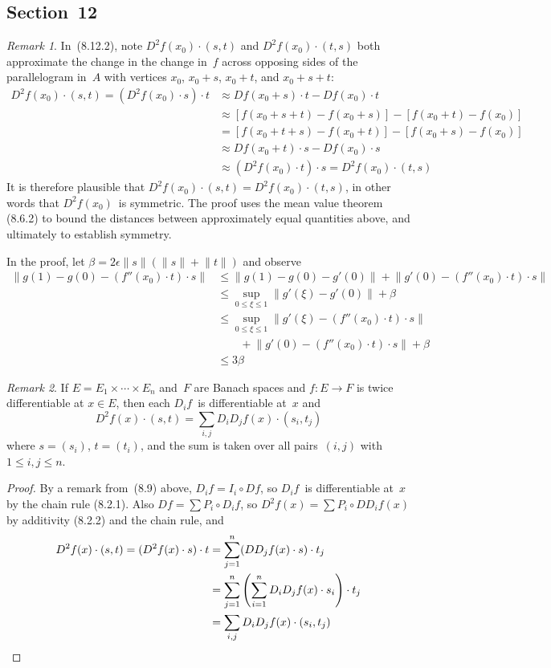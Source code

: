 \documentclass[letterpaper,12pt]{article}
\newcommand{\after}{\circ}
\newcommand{\at}{\cdot}
\newcommand{\norm}[1]{\lVert{#1}\rVert}
\theoremstyle{plain}
\theoremstyle{definition}
\theoremstyle{remark}
\newtheorem*{rmk}{Remark}
\begin{document}
\subsection*{Section~12}
\begin{rmk}
In~(8.12.2), note \(D^2f(x_0)\at(s,t)\) and \(D^2f(x_0)\at(t,s)\) both approximate the change in the change in~\(f\) across opposing sides of the parallelogram in~\(A\) with vertices \(x_0\), \(x_0+s\), \(x_0+t\), and \(x_0+s+t\):
\begin{align*}
D^2f(x_0)\at(s,t)=(D^2f(x_0)\at s)\at t&\approx Df(x_0+s)\at t-Df(x_0)\at t\\
	&\approx[f(x_0+s+t)-f(x_0+s)]-[f(x_0+t)-f(x_0)]\\
	&=[f(x_0+t+s)-f(x_0+t)]-[f(x_0+s)-f(x_0)]\\
	&\approx Df(x_0+t)\at s-Df(x_0)\at s\\
	&\approx(D^2f(x_0)\at t)\at s=D^2f(x_0)\at(t,s)
\end{align*}
It is therefore plausible that \(D^2f(x_0)\at(s,t)=D^2f(x_0)\at(t,s)\), in other words that \(D^2f(x_0)\)~is symmetric. The proof uses the mean value theorem (8.6.2) to bound the distances between approximately equal quantities above, and ultimately to establish symmetry.

In the proof, let \(\beta=2\epsilon\norm{s}(\norm{s}+\norm{t})\) and observe
\begin{align*}
\norm{g(1)-g(0)-(f''(x_0)\at t)\at s}&\le\norm{g(1)-g(0)-g'(0)}+\norm{g'(0)-(f''(x_0)\at t)\at s}\\
	&\le\sup_{0\le\xi\le 1}\norm{g'(\xi)-g'(0)}+\beta\\
	&\le\sup_{0\le\xi\le 1}\norm{g'(\xi)-(f''(x_0)\at t)\at s}\\
	&\qquad+\norm{g'(0)-(f''(x_0)\at t)\at s}+\beta\\
	&\le3\beta
\end{align*}
\end{rmk}

\begin{rmk}
If \(E=E_1\times\cdots\times E_n\) and~\(F\) are Banach spaces and \(f:E\to F\) is twice differentiable at \(x\in E\), then each \(D_i f\)~is differentiable at~\(x\) and
\[D^2f(x)\at(s,t)=\sum_{i,j}D_iD_jf(x)\at(s_i,t_j)\]
where \(s=(s_i)\), \(t=(t_i)\), and the sum is taken over all pairs~\((i,j)\) with \(1\le i,j\le n\).
\end{rmk}
\begin{proof}
By a remark from~(8.9) above, \(D_if=I_i\after Df\), so \(D_if\)~is differentiable at~\(x\) by the chain rule (8.2.1). Also \(Df=\sum P_i\after D_if\), so \(D^2f(x)=\sum P_i\after DD_if(x)\) by additivity (8.2.2) and the chain rule, and
\begin{align*}
D^2f(x)\at(s,t)=(D^2f(x)\at s)\at t&=\sum_{j=1}^n(DD_jf(x)\at s)\at t_j\\
	&=\sum_{j=1}^n\left(\sum_{i=1}^nD_iD_jf(x)\at s_i\right)\at t_j\\
	&=\sum_{i,j}D_iD_jf(x)\at(s_i,t_j)\qedhere
\end{align*}
\end{proof}
\end{document}
